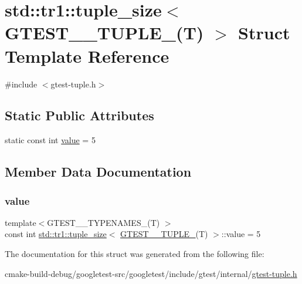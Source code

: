 \hypertarget{structstd_1_1tr1_1_1tuple__size_3_01GTEST__5__TUPLE___07T_08_01_4}{}\section{std\+::tr1\+::tuple\+\_\+size$<$ G\+T\+E\+S\+T\+\_\+\_\+\+T\+U\+P\+L\+E\+\_\+(T) $>$ Struct Template Reference}
\label{structstd_1_1tr1_1_1tuple__size_3_01GTEST__5__TUPLE___07T_08_01_4}


{\ttfamily \#include $<$gtest-\/tuple.\+h$>$}

\subsection*{Static Public Attributes}
\begin{DoxyCompactItemize}
\item 
static const int \mbox{\hyperlink{structstd_1_1tr1_1_1tuple__size_3_01GTEST__5__TUPLE___07T_08_01_4_a83d207f8b8e95d9b747a586550feefcb}{value}} = 5
\end{DoxyCompactItemize}


\subsection{Member Data Documentation}
\mbox{\label{structstd_1_1tr1_1_1tuple__size_3_01GTEST__5__TUPLE___07T_08_01_4_a83d207f8b8e95d9b747a586550feefcb}} 
\subsubsection{\texorpdfstring{value}{value}}
{\footnotesize\ttfamily template$<$G\+T\+E\+S\+T\+\_\+\_\+\+T\+Y\+P\+E\+N\+A\+M\+E\+S\+\_\+(\+T) $>$ \\
const int \mbox{\hyperlink{structstd_1_1tr1_1_1tuple__size}{std\+::tr1\+::tuple\+\_\+size}}$<$ \mbox{\hyperlink{namespacestd_1_1tr1_a51b070e2eb5e6bb83a290f35c19667dd}{G\+T\+E\+S\+T\+\_\+\_\+\+T\+U\+P\+L\+E\+\_\+}}(T) $>$\+::value = 5\hspace{0.3cm}{\ttfamily [static]}}



The documentation for this struct was generated from the following file\+:\begin{DoxyCompactItemize}
\item 
cmake-\/build-\/debug/googletest-\/src/googletest/include/gtest/internal/\mbox{\hyperlink{gtest-tuple_8h}{gtest-\/tuple.\+h}}\end{DoxyCompactItemize}
